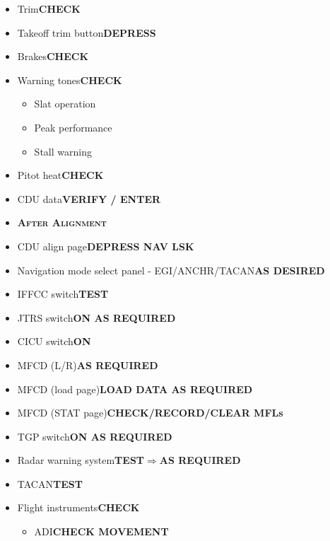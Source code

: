 \documentclass[a4paper,12pt,dvipsnames]{letter}
\newcommand{\button}[1]{\textbf{#1}}
\newcommand{\myHead}[1]{{\LARGE\textsc{\textbf{#1}}}}
\begin{document}
{\begin{itemize}
\begin{itemize}
  \begin{itemize}
   \item Speed brakes\dotfill\button{40\% OPEN}
  \end{itemize}
  \item Anti-skid switch\dotfill\button{OFF}
 \end{itemize}
 \item Trim\dotfill\button{CHECK}
 \item Takeoff trim button\dotfill\button{DEPRESS}
 \item Brakes\dotfill\button{CHECK}
 \item Warning tones\dotfill\button{CHECK}
 \begin{itemize}
  \item Slat operation
  \item Peak performance
  \item Stall warning
 \end{itemize}
 \item Pitot heat\dotfill\button{CHECK}
 \item CDU data\dotfill\button{VERIFY / ENTER}
\end{itemize}
%
\newpage
\begin{itemize}
 \item[] \myHead{After Alignment}
 \item CDU align page\dotfill\button{DEPRESS NAV LSK}
 \item Navigation mode select panel - EGI/ANCHR/TACAN\dotfill\button{AS DESIRED}
 \item IFFCC switch\dotfill\button{TEST}
 \item JTRS switch\dotfill\button{ON AS REQUIRED}
 \item CICU switch\dotfill\button{ON}
 \item MFCD (L/R)\dotfill\button{AS REQUIRED}
 \item MFCD (load page)\dotfill\button{LOAD DATA AS REQUIRED}
 \item MFCD (STAT page)\dotfill\button{CHECK/RECORD/CLEAR MFLs}
 \item TGP switch\dotfill\button{ON AS REQUIRED}
 \item Radar warning system\dotfill\button{TEST\;$\Rightarrow$\;AS REQUIRED}
 \item TACAN\dotfill\button{TEST}
 \item Flight instruments\dotfill\button{CHECK}
 \begin{itemize}
  \item ADI\dotfill\button{CHECK MOVEMENT}

\end{itemize}
\end{itemize}}
\end{document}
